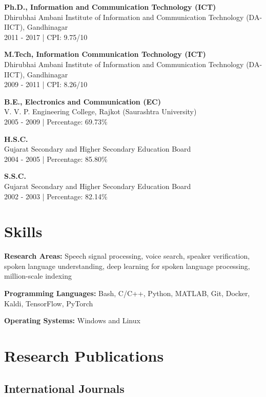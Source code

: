 \documentclass[10pt]{article}
\begin{document}
\noindent\textbf{Ph.D., Information and Communication Technology (ICT)} \\
Dhirubhai Ambani Institute of Information and Communication Technology (DA-IICT), Gandhinagar \\
2011 - 2017 | CPI: 9.75/10

\noindent\textbf{M.Tech, Information Communication Technology (ICT)} \\
Dhirubhai Ambani Institute of Information and Communication Technology (DA-IICT), Gandhinagar \\
2009 - 2011 | CPI: 8.26/10

\noindent\textbf{B.E., Electronics and Communication (EC)} \\
V. V. P. Engineering College, Rajkot (Saurashtra University) \\
2005 - 2009 | Percentage: 69.73\%

\noindent\textbf{H.S.C.} \\
Gujarat Secondary and Higher Secondary Education Board \\
2004 - 2005 | Percentage: 85.80\%

\noindent\textbf{S.S.C.} \\
Gujarat Secondary and Higher Secondary Education Board \\
2002 - 2003 | Percentage: 82.14\%

\section*{Skills}

\noindent\textbf{Research Areas:} Speech signal processing, voice search, speaker verification, spoken language understanding, deep learning for spoken language processing, million-scale indexing

\noindent\textbf{Programming Languages:} Bash, C/C++, Python, MATLAB, Git, Docker, Kaldi, TensorFlow, PyTorch

\noindent\textbf{Operating Systems:} Windows and Linux

\section*{Research Publications}

\subsection*{International Journals}
\end{document}
